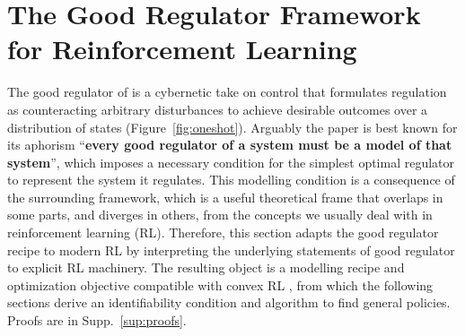 \section[The Good Regulator Framework for Reinforcement Learning]{The Good Regulator Framework for Reinforcement Learning}
\label{sec:objective}


The good regulator of \citet{Conant-good70} is a cybernetic take on control that formulates regulation as counteracting arbitrary disturbances to achieve desirable outcomes over a distribution of states (Figure~\ref{fig:oneshot}).
Arguably the paper is best known for its aphorism ``\textbf{every good regulator of a system must be a model of that system}'', which imposes a necessary condition for the simplest optimal regulator to represent the system it regulates.
This modelling condition is a consequence of the surrounding framework, which is a useful theoretical frame that overlaps in some parts, and diverges in others, from the concepts we usually deal with in reinforcement learning (RL).
Therefore, this section adapts the good regulator recipe to modern RL by interpreting the underlying statements of good regulator to explicit RL machinery.
The resulting object is a modelling recipe and optimization objective compatible with convex RL \citep{Zahavy-reward21}, from which the following sections derive an identifiability condition and algorithm to find general policies.
Proofs are in Supp.~\ref{sup:proofs}.


